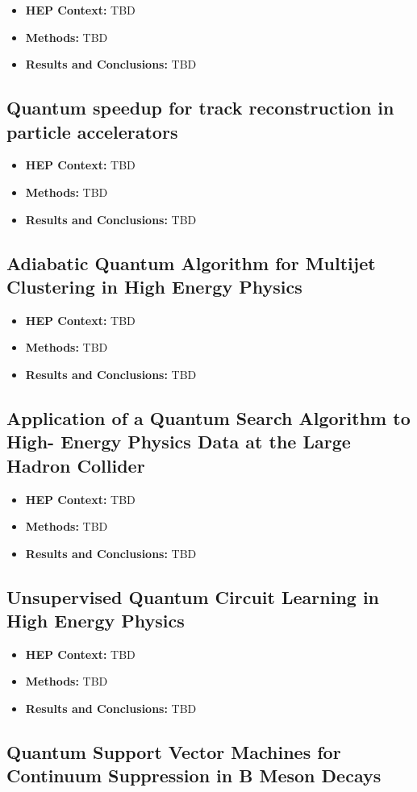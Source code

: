 \begin{itemize}
	\item \textbf{HEP Context: }TBD
	\item \textbf{Methods: }TBD
	\item \textbf{Results and Conclusions: }TBD
\end{itemize}\subsection{Quantum speedup for track reconstruction in particle accelerators~\cite{Magano:2021jzd}}
\begin{itemize}
	\item \textbf{HEP Context: }TBD
	\item \textbf{Methods: }TBD
	\item \textbf{Results and Conclusions: }TBD
\end{itemize}\subsection{Adiabatic Quantum Algorithm for Multijet Clustering in High Energy Physics~\cite{Pires:2020urc}}
\begin{itemize}
	\item \textbf{HEP Context: }TBD
	\item \textbf{Methods: }TBD
	\item \textbf{Results and Conclusions: }TBD
\end{itemize}\subsection{Application of a Quantum Search Algorithm to High- Energy Physics Data at the Large Hadron Collider~\cite{Armenakas:2020ymp}}
\begin{itemize}
	\item \textbf{HEP Context: }TBD
	\item \textbf{Methods: }TBD
	\item \textbf{Results and Conclusions: }TBD
\end{itemize}\subsection{Unsupervised Quantum Circuit Learning in High Energy Physics~\cite{Delgado:2022aty}}
\begin{itemize}
	\item \textbf{HEP Context: }TBD
	\item \textbf{Methods: }TBD
	\item \textbf{Results and Conclusions: }TBD
\end{itemize}\subsection{Quantum Support Vector Machines for Continuum Suppression in B Meson Decays~\cite{Heredge:2021vww}}
